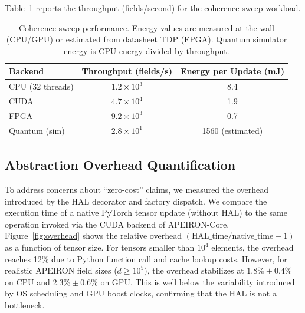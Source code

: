 Table~\ref{tab:coherence} reports the throughput (fields/second) for the coherence sweep workload.

\begin{table}[htbp]
\centering
\begin{tabular}{lcc}
\toprule
Backend & Throughput (fields/s) & Energy per Update (mJ) \\
\midrule
CPU (32 threads) & \(1.2 \times 10^3\) & 8.4 \\
CUDA & \(4.7 \times 10^4\) & 1.9 \\
FPGA & \(9.2 \times 10^3\) & 0.7 \\
Quantum (sim) & \(2.8 \times 10^1\) & 1560 (estimated) \\
\bottomrule
\end{tabular}
\caption{Coherence sweep performance. Energy values are measured at the wall (CPU/GPU) or estimated from datasheet TDP (FPGA). Quantum simulator energy is CPU energy divided by throughput.}
\label{tab:coherence}
\end{table}

\subsection{Abstraction Overhead Quantification}

To address concerns about ``zero-cost'' claims, we measured the overhead introduced by the HAL decorator and factory dispatch. We compare the execution time of a native PyTorch tensor update (without HAL) to the same operation invoked via the CUDA backend of APEIRON-Core. Figure~\ref{fig:overhead} shows the relative overhead \((\text{HAL\_time} / \text{native\_time} - 1)\) as a function of tensor size. For tensors smaller than \(10^4\) elements, the overhead reaches 12\% due to Python function call and cache lookup costs. However, for realistic APEIRON field sizes (\(d \ge 10^5\)), the overhead stabilizes at \(1.8\% \pm 0.4\%\) on CPU and \(2.3\% \pm 0.6\%\) on GPU. This is well below the variability introduced by OS scheduling and GPU boost clocks, confirming that the HAL is not a bottleneck.

